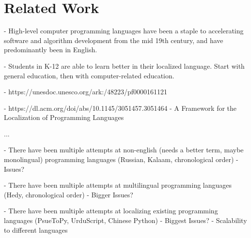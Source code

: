 \documentclass[conference]{IEEEtran}
\begin{document}


\section{Related Work}

- High-level computer programming languages have been a staple to accelerating software and algorithm development from the mid 19th century, and have predominantly been in English. 

- Students in K-12 are able to learn better in their localized language. Start with general education, then with computer-related education.

  - https://unesdoc.unesco.org/ark:/48223/pf0000161121



  - https://dl.acm.org/doi/abs/10.1145/3051457.3051464
  - A Framework for the Localization of Programming Languages

  ...

- There have been multiple attempts at non-english (needs a better term, maybe monolingual) programming languages (Russian, Kalaam, chronological order)
  - Issues?

- There have been multiple attempts at multilingual programming languages (Hedy, chronological order)
  - Bigger Issues?

- There have been multiple attempts at localizing existing programming languages (PsueToPy, UrduScript, Chinese Python)
  - Biggest Issues?
    - Scalability to different languages


\end{document}
